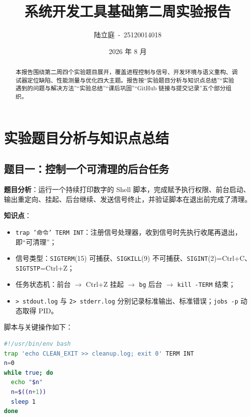 \documentclass[a4paper, 12pt]{article}
\title{\textbf{\color{primary}系统开发工具基础\quad 第二周实验报告}}
\author{陆立庭\ -\ 25120014018}
\date{2026 年 8 月}
\begin{document}
\maketitle
\vspace{-0.5em}
\noindent{\color{primary}\rule{\textwidth}{1pt}}

\begin{abstract}
本报告围绕第二周四个实验题目展开，覆盖进程控制与信号、开发环境与语义重构、调试器定位缺陷、性能测量与优化四大主题。报告按“实验题目分析与知识点总结”“实验遇到的问题与解决方法”“实验总结”“课后巩固”“GitHub 链接与提交记录”五个部分组织。
\end{abstract}

\tableofcontents
\newpage

\section{实验题目分析与知识点总结}

\subsection{题目一：控制一个可清理的后台任务}

\textbf{题目分析}：运行一个持续打印数字的 Shell 脚本，完成赋予执行权限、前台启动、输出重定向、挂起、后台继续、发送信号终止，并验证脚本在退出前完成了清理。

\textbf{知识点}：
\begin{itemize}
  \item \texttt{trap '命令' TERM INT}：注册信号处理器，收到信号时先执行收尾再退出，即“可清理”；
  \item 信号类型：\texttt{SIGTERM}(15) 可捕获、\texttt{SIGKILL}(9) 不可捕获、\texttt{SIGINT}(2)=Ctrl+C、\texttt{SIGTSTP}=Ctrl+Z；
  \item 任务状态机：前台 $\rightarrow$ Ctrl+Z 挂起 $\rightarrow$ \texttt{bg} 后台 $\rightarrow$ \texttt{kill -TERM} 结束；
  \item \texttt{> stdout.log} 与 \texttt{2> stderr.log} 分别记录标准输出、标准错误；\texttt{jobs -p} 动态取得 PID。
\end{itemize}

脚本与关键操作如下：

\begin{lstlisting}[language=bash]
#!/usr/bin/env bash
trap 'echo CLEAN_EXIT >> cleanup.log; exit 0' TERM INT
n=0
while true; do
  echo "$n"
  n=$((n+1))
  sleep 1
done
\end{lstlisting}
\end{document}
